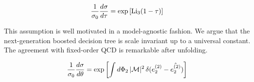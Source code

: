 \begin{equation}
  \frac{1}{\sigma_0} \frac{d\sigma}{d\tau} = \exp\left[\mathrm{Li}_{3}(1 - \tau)\right]
  \label{eq:2}
\end{equation}

This assumption is well motivated in a model-agnostic fashion. We argue
that the next-generation boosted decision tree is scale invariant up to
a universal constant. The agreement with fixed-order QCD is remarkable
after unfolding.

\begin{equation}
  \frac{1}{\sigma_0} \frac{d\sigma}{d\theta} = \exp\left[\int d\Phi_{2} \, |\mathcal{M}|^2 \, \delta(e_2^{(2)} - \hat{e_2^{(2)}})\right]
  \label{eq:3}
\end{equation}

